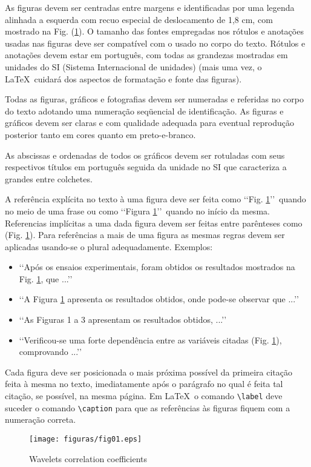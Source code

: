 As figuras devem ser centradas entre margens e identificadas por uma legenda
alinhada a esquerda com recuo especial de deslocamento de 1,8 cm, com mostrado
na Fig. (\ref{fig01}). O tamanho das fontes empregadas nos rótulos e anotações
usadas nas figuras deve ser compatível com o usado no corpo do texto. Rótulos e
anotações devem estar em português, com todas as grandezas mostradas em
unidades do SI (Sistema Internacional de unidades) (mais uma vez, o \LaTeX\
cuidará dos aspectos de formatação e fonte das figuras).

Todas as figuras, gráficos e fotografias devem ser numeradas e referidas no
corpo do texto adotando uma numeração seqüencial de identificação. As figuras e
gráficos devem ser claras e com qualidade adequada para eventual reprodução
posterior tanto em cores quanto em preto-e-branco.

As abscissas e ordenadas de todos os gráficos devem ser rotuladas com seus
respectivos títulos em português seguida da unidade no SI que caracteriza a
grandes entre colchetes.

A referência explícita no texto à uma figura deve ser feita como
\lq\lq Fig. \ref{fig01}\rq\rq\ quando no meio de uma frase ou como
\lq\lq Figura \ref{fig01}\rq\rq\ quando no início da mesma. Referencias
implícitas a uma dada figura devem ser feitas entre parênteses como
(Fig. \ref{fig01}). Para referências a mais de uma figura as mesmas regras
devem ser aplicadas usando-se o plural adequadamente. Exemplos:

\begin{itemize}
	\item \lq\lq Após os ensaios experimentais, foram obtidos os resultados
	mostrados na Fig. \ref{fig01}, que ...\rq\rq
	\item \lq\lq A Figura \ref{fig01} apresenta os resultados obtidos, onde
	pode-se observar que ...\rq\rq
	\item \lq\lq As Figuras 1 a 3 apresentam os resultados obtidos,
	...\rq\rq
	\item \lq\lq Verificou-se uma forte dependência entre as variáveis citadas
	(Fig. \ref{fig01}), comprovando ...\rq\rq
\end{itemize}

Cada figura deve ser posicionada o mais próxima possível da primeira citação
feita à mesma no texto, imediatamente após o parágrafo no qual é feita tal
citação, se possível, na mesma página. Em \LaTeX\, o comando \texttt{\textbackslash label} deve suceder o comando \texttt{\textbackslash caption} para que as referências às figuras fiquem com a numeração correta.
\begin{figure}[h]
	\centering
	\texttt{[image: figuras/fig01.eps]}
	\caption{Wavelets correlation coefficients}
	\label{fig01}
\end{figure}

